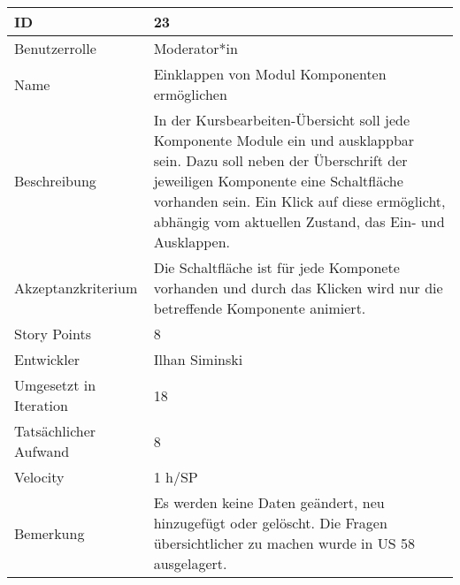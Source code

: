\begin{tabularx}{\textwidth}{|p{}|X|}
	\hline
	ID & 23\\
	\hline
	Benutzerrolle & Moderator*in\\
	\hline
	Name & Einklappen von Modul Komponenten ermöglichen\\
	\hline
	Beschreibung & In der Kursbearbeiten-Übersicht soll jede Komponente Module ein und ausklappbar sein.
		Dazu soll neben der Überschrift der jeweiligen Komponente eine Schaltfläche vorhanden sein.
		Ein Klick auf diese ermöglicht, abhängig vom aktuellen Zustand, das Ein- und Ausklappen. \\
	\hline
	Akzeptanzkriterium & Die Schaltfläche ist für jede Komponete vorhanden und durch das Klicken wird nur die betreffende Komponente animiert.\\
	\hline
	Story Points & 8 \\
	\hline
	Entwickler & Ilhan Siminski\\
	\hline
	Umgesetzt in Iteration & 18\\
	\hline
	Tatsächlicher Aufwand & 8\\
	\hline
	Velocity & 1 h/SP\\
	\hline
	Bemerkung & Es werden keine Daten geändert, neu hinzugefügt oder gelöscht. Die Fragen übersichtlicher zu machen wurde in US 58 ausgelagert.\\
	\hline
\end{tabularx}
\vspace{20pt}
